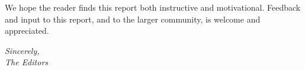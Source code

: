 We hope the reader finds this report both instructive and motivational.  
Feedback and input to this report, and to the larger community, is welcome and appreciated.  

\begin{flushright} 
\textit{
Sincerely, \\The Editors
}
\end{flushright}
